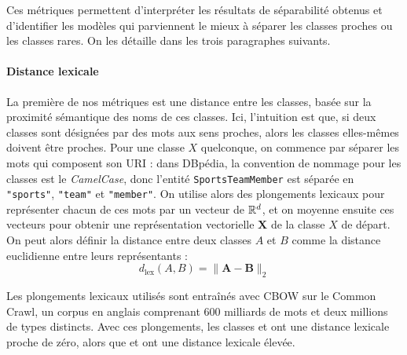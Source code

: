 Ces métriques permettent d'interpréter les résultats de séparabilité obtenus et d'identifier les modèles qui parviennent le mieux à séparer les classes proches ou les classes rares. On les détaille dans les trois paragraphes suivants.


\paragraph{Distance lexicale}

La première de nos métriques est une distance entre les classes, basée sur la proximité sémantique des noms de ces classes.
Ici, l'intuition est que, si deux classes sont désignées par des mots aux sens proches, alors les classes elles-mêmes doivent être proches. 
Pour une classe $X$ quelconque, on commence par séparer les mots qui composent son URI : dans DBpédia, la convention de nommage pour les classes est le \textit{CamelCase}, donc l'entité \texttt{SportsTeamMember} est séparée en \texttt{"sports"}, \texttt{"team"} et \texttt{"member"}. On utilise alors des plongements lexicaux pour représenter chacun de ces mots par un vecteur de $\mathbb{R}^d$, et on moyenne ensuite ces vecteurs pour obtenir une représentation vectorielle $\mathbf{X}$ de la classe $X$ de départ. On peut alors définir la distance entre deux classes $A$ et $B$ comme la distance euclidienne entre leurs représentants :
\begin{equation}
d_\text{lex}(A, B) = \| \mathbf{A} - \mathbf{B} \|_2
\end{equation}

Les plongements lexicaux utilisés sont entraînés avec CBOW \cite{mikolov2018advances} sur le Common Crawl, un corpus en anglais comprenant 600 milliards de mots et deux millions de types distincts. Avec ces plongements, les classes  et  ont une distance lexicale proche de zéro, alors que  et  ont une distance lexicale élevée.


